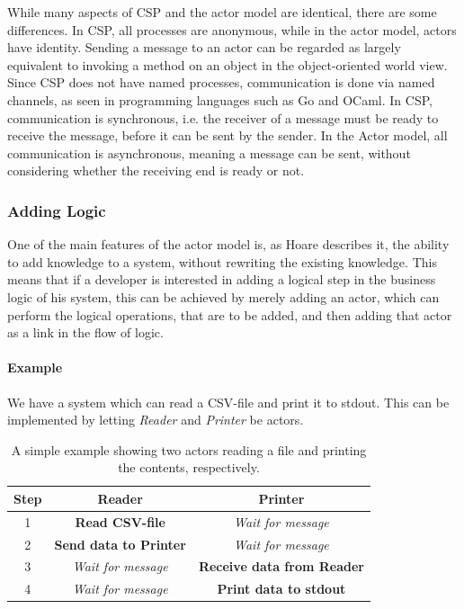 While many aspects of CSP and the actor model are identical, there are some differences. In CSP, all processes are anonymous, while in the actor model, actors have identity. Sending a message to an actor can be regarded as largely equivalent to invoking a method on an object in the object-oriented world view. Since CSP does not have named processes, communication is done via named channels, as seen in programming languages such as Go and OCaml. 
In CSP, communication is synchronous, i.e. the receiver of a message must be ready to receive the message, before it can be sent by the sender. In the Actor model, all communication is asynchronous, meaning a message can be sent, without considering whether the receiving end is ready or not.

\subsubsection{Adding Logic}
One of the main features of the actor model is, as Hoare describes it, the ability to add knowledge to a system, without rewriting the existing knowledge. This means that if a developer is interested in adding a logical step in the business logic of his system, this can be achieved by merely adding an actor, which can perform the logical operations, that are to be added, and then adding that actor as a link in the flow of logic.

\paragraph{Example}
We have a system which can read a CSV-file and print it to stdout. This can be implemented by letting \emph{Reader} and \emph{Printer} be actors.

\begin{table}[htbp]
\centering
\begin{tabular}{ | c | c | c | }
\hline
Step & Reader & Printer \\\hline
1 & \textbf{Read CSV-file} & \textit{Wait for message} \\\hline
2 & \textbf{Send data to Printer} & \textit{Wait for message}\\\hline
3 & \textit{Wait for message} & \textbf{Receive data from Reader}\\\hline
4 & \textit{Wait for message} & \textbf{Print data to stdout}\\\hline
\end{tabular}
\label{ReadPrintExample}
\caption{A simple example showing two actors reading a file and printing the contents, respectively.}
\end{table}

